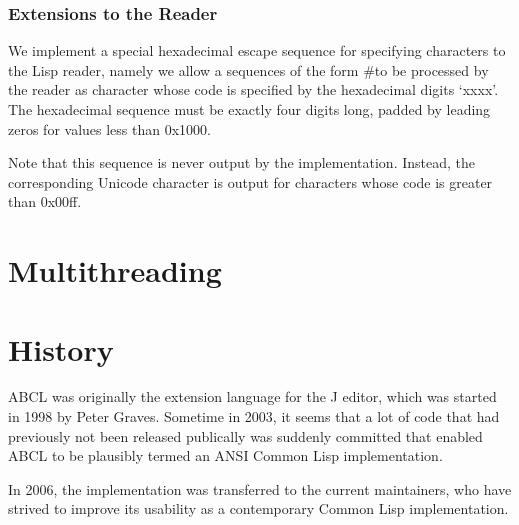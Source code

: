 \subsubsection{Extensions to the Reader}

We implement a special hexadecimal escape sequence for specifying
characters to the Lisp reader, namely we allow a sequences of the form
#\Uxxxx to be processed by the reader as character whose code is
specified by the hexadecimal digits `xxxx'.  The hexadecimal sequence
must be exactly four digits long, padded by leading zeros for values
less than 0x1000.

Note that this sequence is never output by the implementation.  Instead,
the corresponding Unicode character is output for characters whose
code is greater than 0x00ff.

\section{Multithreading}



\section{History}

ABCL was originally the extension language for the J editor, which was
started in 1998 by Peter Graves.  Sometime in 2003, it seems that a
lot of code that had previously not been released publically was
suddenly committed that enabled ABCL to be plausibly termed an ANSI
Common Lisp implementation.  

In 2006, the implementation was transferred to the current
maintainers, who have strived to improve its usability as a
contemporary Common Lisp implementation.





